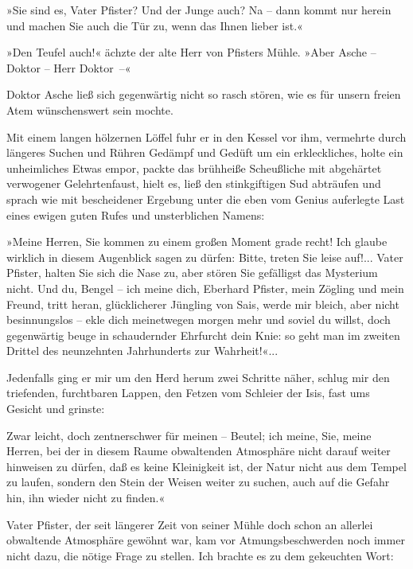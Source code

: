 »Sie sind es, Vater Pfister? Und der Junge auch? Na – dann kommt
nur herein und machen Sie auch die Tür zu, wenn das Ihnen lieber
ist.«

»Den Teufel auch!« ächzte der alte Herr von Pfisters Mühle. »Aber
Asche – Doktor – Herr Doktor~–«

Doktor Asche ließ sich gegenwärtig nicht so rasch stören, wie es
für unsern freien Atem wünschenswert sein mochte.

Mit einem langen hölzernen Löffel fuhr er in den Kessel vor ihm,
vermehrte durch längeres Suchen und Rühren Gedämpf und Gedüft um
ein erkleckliches, holte ein unheimliches Etwas empor, packte das
brühheiße Scheußliche mit abgehärtet verwogener Gelehrtenfaust,
hielt es, ließ den stinkgiftigen Sud abträufen und sprach wie mit
bescheidener Ergebung unter die eben vom Genius auferlegte Last
eines ewigen guten Rufes und unsterblichen Namens:

»Meine Herren, Sie kommen zu einem großen Moment grade recht! Ich
glaube wirklich in diesem Augenblick sagen zu dürfen: Bitte, treten
Sie leise auf!... Vater Pfister, halten Sie sich die Nase zu, aber
stören Sie gefälligst das Mysterium nicht. Und du, Bengel – ich
meine dich, Eberhard Pfister, mein Zögling und mein Freund, tritt
heran, glücklicherer Jüngling von Sais, werde mir bleich, aber
nicht besinnungslos – ekle dich meinetwegen morgen mehr und soviel
du willst, doch gegenwärtig beuge in schaudernder Ehrfurcht dein
Knie: so geht man im zweiten Drittel des neunzehnten Jahrhunderts
zur Wahrheit!«...

Jedenfalls ging er mir um den Herd herum zwei Schritte näher,
schlug mir den triefenden, furchtbaren Lappen, den Fetzen vom
Schleier der Isis, fast ums Gesicht und grinste:

Zwar leicht, doch zentnerschwer für meinen – Beutel; ich meine,
Sie, meine Herren, bei der in diesem Raume obwaltenden Atmosphäre
nicht darauf weiter hinweisen zu dürfen, daß es keine Kleinigkeit
ist, der Natur nicht aus dem Tempel zu laufen, sondern den Stein
der Weisen weiter zu suchen, auch auf die Gefahr hin, ihn wieder
nicht zu finden.«

Vater Pfister, der seit längerer Zeit von seiner Mühle doch schon
an allerlei obwaltende Atmosphäre gewöhnt war, kam vor
Atmungsbeschwerden noch immer nicht dazu, die nötige Frage zu
stellen. Ich brachte es zu dem gekeuchten Wort:

